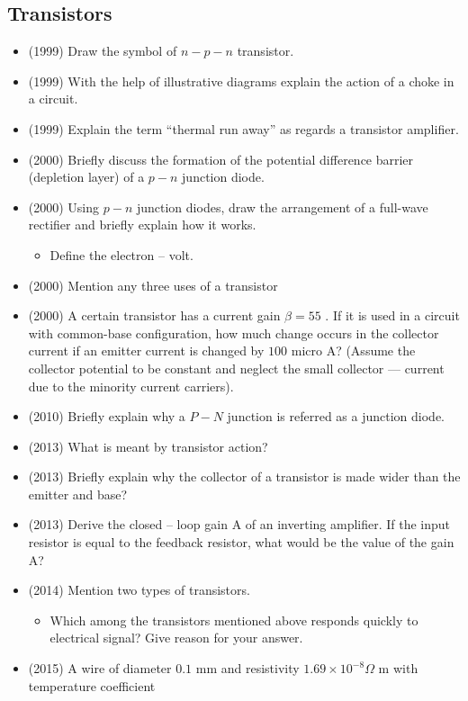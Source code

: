 \documentclass{article}
\begin{document}
\subsection{Transistors}
\begin{itemize}
\item (1999)  Draw the symbol of $ n-p-n$ transistor.
\item (1999)  With the help of illustrative diagrams explain the action of a choke in a circuit.
\item (1999)  Explain the term “thermal run away” as regards a transistor amplifier.
\item (2000)  Briefly discuss the formation of the potential difference barrier (depletion layer) of a $ p-n$ junction diode.
\item (2000)  Using $ p-n$ junction diodes, draw the arrangement of a full-wave rectifier and briefly explain how it works.
 \begin{itemize}
\item Define the electron – volt.
\end{itemize}
\item (2000)  Mention any three uses of a transistor
\item (2000)  A certain transistor has a current gain $  \beta =55$ . If it is used in a circuit with common-base configuration, how much change occurs in the collector current if an emitter current is changed by $ 100$ micro A? (Assume the collector potential to be constant and neglect the small collector — current due to the minority current carriers).
\item (2010)  Briefly explain why a $ P-N$ junction is referred as a junction diode.
\item (2013)  What is meant by transistor action?
\item (2013)  Briefly explain why the collector of a transistor is made wider than the emitter and base?
\item (2013)  Derive the closed – loop gain A of an inverting amplifier.  If the input resistor is equal to the feedback resistor, what would be the value of the gain A?
\item (2014)  Mention two types of transistors.
 \begin{itemize}
\item Which among the transistors mentioned above responds quickly to electrical signal? Give reason for your answer.
\end{itemize}
\item (2015)  A wire of diameter $ 0.1$ mm and resistivity $ 1.69\times10^{-8}\Omega$ m with temperature coefficient

\end{itemize}
\end{document}
